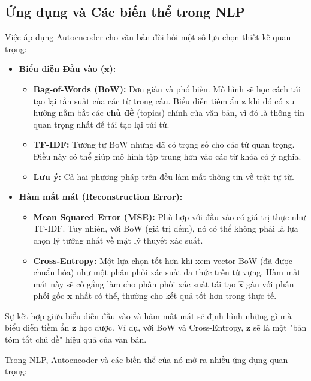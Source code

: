 \subsection{Ứng dụng và Các biến thể trong NLP}
\begin{tcolorbox}[
    title=Lựa chọn Thiết kế cho Autoencoder trong NLP,
    colback=orange!5!white, colframe=orange!60!black, fonttitle=\bfseries
]
Việc áp dụng Autoencoder cho văn bản đòi hỏi một số lựa chọn thiết kế quan trọng:
\begin{itemize}
    \item \textbf{Biểu diễn Đầu vào ($\mathbf{x}$):}
    \begin{itemize}
        \item \textbf{Bag-of-Words (BoW):} Đơn giản và phổ biến. Mô hình sẽ học cách tái tạo lại tần suất của các từ trong câu. Biểu diễn tiềm ẩn $\mathbf{z}$ khi đó có xu hướng nắm bắt các \textbf{chủ đề} (topics) chính của văn bản, vì đó là thông tin quan trọng nhất để tái tạo lại túi từ.
        \item \textbf{TF-IDF:} Tương tự BoW nhưng đã có trọng số cho các từ quan trọng. Điều này có thể giúp mô hình tập trung hơn vào các từ khóa có ý nghĩa.
        \item \textbf{Lưu ý:} Cả hai phương pháp trên đều làm mất thông tin về trật tự từ.
    \end{itemize}
    \item \textbf{Hàm mất mát (Reconstruction Error):}
    \begin{itemize}
        \item \textbf{Mean Squared Error (MSE):} Phù hợp với đầu vào có giá trị thực như TF-IDF. Tuy nhiên, với BoW (giá trị đếm), nó có thể không phải là lựa chọn lý tưởng nhất về mặt lý thuyết xác suất.
        \item \textbf{Cross-Entropy:} Một lựa chọn tốt hơn khi xem vector BoW (đã được chuẩn hóa) như một phân phối xác suất đa thức trên từ vựng. Hàm mất mát này sẽ cố gắng làm cho phân phối xác suất tái tạo $\hat{\mathbf{x}}$ gần với phân phối gốc $\mathbf{x}$ nhất có thể, thường cho kết quả tốt hơn trong thực tế.
    \end{itemize}
\end{itemize}
Sự kết hợp giữa biểu diễn đầu vào và hàm mất mát sẽ định hình những gì mà biểu diễn tiềm ẩn $\mathbf{z}$ học được. Ví dụ, với BoW và Cross-Entropy, $\mathbf{z}$ sẽ là một "bản tóm tắt chủ đề" hiệu quả của văn bản.
\end{tcolorbox}
Trong NLP, Autoencoder và các biến thể của nó mở ra nhiều ứng dụng quan trọng:
